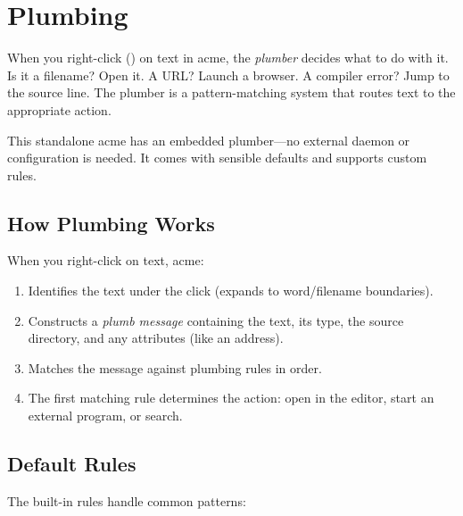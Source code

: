 \chapter{Plumbing}
\label{ch:plumbing}


When you right-click () on text in acme, the \emph{plumber}
decides what to do with it.  Is it a filename?  Open it.  A URL?
Launch a browser.  A compiler error?  Jump to the source line.  The
plumber is a pattern-matching system that routes text to the appropriate
action.

This standalone acme has an embedded plumber---no external daemon or
configuration is needed.  It comes with sensible defaults and supports
custom rules.

\section{How Plumbing Works}

When you right-click on text, acme:

\begin{enumerate}
\item Identifies the text under the click (expands to word/filename
      boundaries).
\item Constructs a \emph{plumb message} containing the text, its type,
      the source directory, and any attributes (like an address).
\item Matches the message against plumbing rules in order.
\item The first matching rule determines the action: open in the editor,
      start an external program, or search.
\end{enumerate}

\section{Default Rules}
\label{sec:defaultrules}


The built-in rules handle common patterns:


